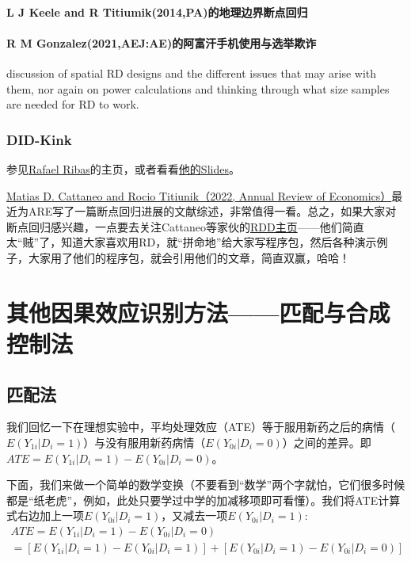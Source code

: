\documentclass[cn,12pt,math=newtx,citestyle=gb7714-2015,bibstyle=gb7714-2015]{elegantbook}
\begin{document}
   \subsubsection{L J Keele and R Titiumik(2014,PA)的地理边界断点回归}
   
   
   
   \subsubsection{R M Gonzalez(2021,AEJ:AE)的阿富汗手机使用与选举欺诈}
	
	discussion of spatial RD designs and the different issues that may arise with them, nor again on power calculations and thinking through what size samples are needed for RD to work.
	
	
	
	\subsection{DID-Kink}
	
	参见\href{https://sites.google.com/site/r4ribas/codes}{Rafael Ribas}的主页，或者看看\href{https://www.stata.com/meeting/chicago16/slides/chicago16_ribas.pdf}{他的Slides}。
	
	\href{https://rdpackages.github.io/references/Cattaneo-Titiunik_2021_ARE.pdf}{Matias D. Cattaneo and Rocio Titiunik（2022, Annual Review of Economics）}最近为ARE写了一篇断点回归进展的文献综述，非常值得一看。总之，如果大家对断点回归感兴趣，一点要去关注Cattaneo等家伙的\href{https://rdpackages.github.io/}{RDD主页}——他们简直太“贼”了，知道大家喜欢用RD，就“拼命地”给大家写程序包，然后各种演示例子，大家用了他们的程序包，就会引用他们的文章，简直双赢，哈哈！
	
	
	
	
	\chapter{其他因果效应识别方法——匹配与合成控制法}
	
	\section{匹配法}
	
	我们回忆一下在理想实验中，平均处理效应（ATE）等于服用新药之后的病情（$E(Y_{1i}\big|D_i=1)$）与没有服用新药病情（$E(Y_{0i}\big|D_i=0)$）之间的差异。即
	$ATE=E(Y_{1i}\big|D_i=1)-E(Y_{0i}\big|D_i=0)$。
	
	下面，我们来做一个简单的数学变换（不要看到“数学”两个字就怕，它们很多时候都是“纸老虎”，例如，此处只要学过中学的加减移项即可看懂）。我们将ATE计算式右边加上一项$E(Y_{0i}\big|D_i=1)$，又减去一项$E(Y_{0i}\big|D_i=1)$:
	\begin{gather}
		ATE=E(Y_{1i}\big|D_i=1)-E(Y_{0i}\big|D_i=0)\nonumber\\
		=[E(Y_{1i}\big|D_i=1)-E(Y_{0i}\big|D_i=1)]+[E(Y_{0i}\big|D_i=1)-E(Y_{0i}\big|D_i=0)]
	\end{gather}
	
\end{document}
